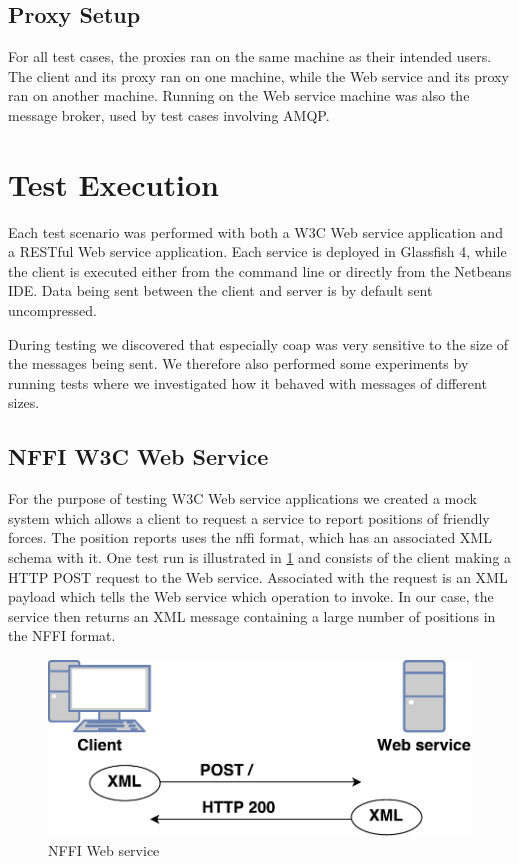 \subsection{Proxy Setup}

For all test cases, the proxies ran on the same machine as their intended users.
The client and its proxy ran on one machine, while the Web service and its proxy
ran on another machine. Running on the Web service machine was also the message
broker, used by test cases involving AMQP.

\section{Test Execution}

 Each test scenario was performed with both a W3C Web service application and a
 RESTful Web service application. Each service is deployed in Glassfish 4, while
 the client is executed either from the command line or directly from the
 Netbeans IDE. Data being sent between the client and server is by default sent
 uncompressed.

During testing we discovered that especially \gls{coap} was very sensitive to
the size of the messages being sent. We therefore also performed some
experiments by running tests where we investigated how it behaved with messages
of different sizes.

\subsection{NFFI W3C Web Service}

For the purpose of testing W3C Web service applications we created a mock system
which allows a client to request a service to report positions of friendly
forces. The position reports uses the \gls{nffi} format, which has an associated
XML schema with it. One test run is illustrated in \cref{figure-nffi-flow} and
consists of the client making a HTTP POST request to the Web service. Associated
with the request is an XML payload which tells the Web service which operation
to invoke. In our case, the service then returns an XML message containing a
large number of positions in the NFFI format.

\begin{figure}[h]
\centering
\includegraphics[scale=0.6]{images/nffi_flow.pdf}
\caption{NFFI Web service}
\label{figure-nffi-flow}
\end{figure}


